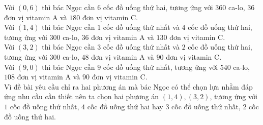 \begin{bt}
{\begin{enumerate}
\begin{center}
					\end{center}
					Với $(0{,}6)$ thì bác Ngọc cần $6$ cốc đồ uống thứ hai, tương ứng với $360$ ca-lo, $36$ đơn vị vitamin A và $180$ đơn vị vitamin C.\\
					Với $(1{,}4)$ thì bác Ngọc cần $1$ cốc đồ uống thứ nhất và $4$ cốc đồ uống thứ hai, tương ứng với $300$ ca-lo, $36$ đơn vị vitamin A và $130$ đơn vị vitamin C.\\
					Với $(3{,}2)$ thì bác Ngọc cần $3$ cốc đồ uống thứ nhất và $2$ cốc đồ uống thứ hai, tương ứng với $300$ ca-lo, $48$ đơn vị vitamin A và $90$ đơn vị vitamin C.\\
					Với $(9{,}0)$ thì bác Ngọc cần $9$ cốc đồ uống thứ nhất, tương ứng với $540$ ca-lo, $108$ đơn vị vitamin A và $90$ đơn vị vitamin C.\\
					Vì đề bài yêu cầu chỉ ra hai phương án mà bác Ngọc có thể chọn lựa nhằm đáp ứng nhu cầu cần thiết nên ta chọn hai phương án $(1{,}4), (3{,}2)$, tương ứng với $1$ cốc đồ uống thứ nhất, $4$ cốc đồ uống thứ hai hay $3$ cốc đồ uống thứ nhất, $2$ cốc đồ uống thứ hai.
				\end{enumerate}
			}
		\end{bt}

